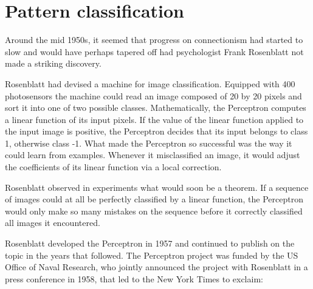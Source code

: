 \documentclass{tufte-book}
\begin{document}
\hypertarget{pattern-classification}{%
\section{Pattern classification}\label{pattern-classification}}

Around the mid 1950s, it seemed that progress on connectionism had
started to slow and would have perhaps tapered off had psychologist
Frank Rosenblatt not made a striking discovery.

Rosenblatt had devised a machine for image classification. Equipped with
400 photosensors the machine could read an image composed of 20 by 20
pixels and sort it into one of two possible classes. Mathematically, the
Perceptron computes a linear function of its input pixels. If the value
of the linear function applied to the input image is positive, the
Perceptron decides that its input belongs to class 1, otherwise class
-1. What made the Perceptron so successful was the way it could learn
from examples. Whenever it misclassified an image, it would adjust the
coefficients of its linear function via a local correction.

Rosenblatt observed in experiments what would soon be a theorem. If a
sequence of images could at all be perfectly classified by a linear
function, the Perceptron would only make so many mistakes on the
sequence before it correctly classified all images it encountered.

Rosenblatt developed the Perceptron in 1957 and continued to publish on
the topic in the years that followed. The Perceptron project was funded
by the US Office of Naval Research, who jointly announced the project
with Rosenblatt in a press conference in 1958, that led to the New York
Times to exclaim:
\end{document}

